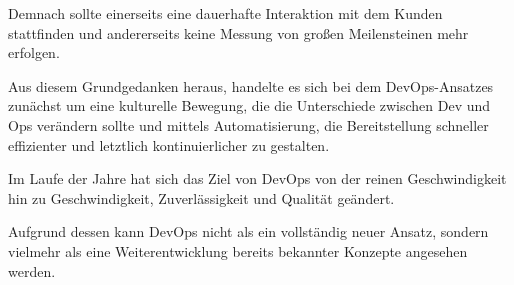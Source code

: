 Demnach sollte einerseits eine dauerhafte Interaktion mit dem Kunden stattfinden und andererseits keine Messung von großen Meilensteinen mehr erfolgen. \cite[S.5]{sharma_devops_2017} 

Aus diesem Grundgedanken heraus, handelte es sich bei dem DevOps-Ansatzes zunächst um eine kulturelle Bewegung, die die Unterschiede zwischen Dev und Ops verändern sollte und mittels Automatisierung, die Bereitstellung schneller effizienter und letztlich kontinuierlicher zu gestalten. \cite[S.5]{sharma_devops_2017} 

Im Laufe der Jahre hat sich das Ziel von DevOps von der reinen Geschwindigkeit hin zu Geschwindigkeit, Zuverlässigkeit und Qualität geändert.\cite[S.xxix]{sharma_devops_2017}  

Aufgrund dessen kann DevOps nicht als ein vollständig neuer Ansatz, sondern vielmehr als eine Weiterentwicklung bereits bekannter Konzepte angesehen werden. \cite[S. 23]{alt_innovationsorientiertes_2017}


